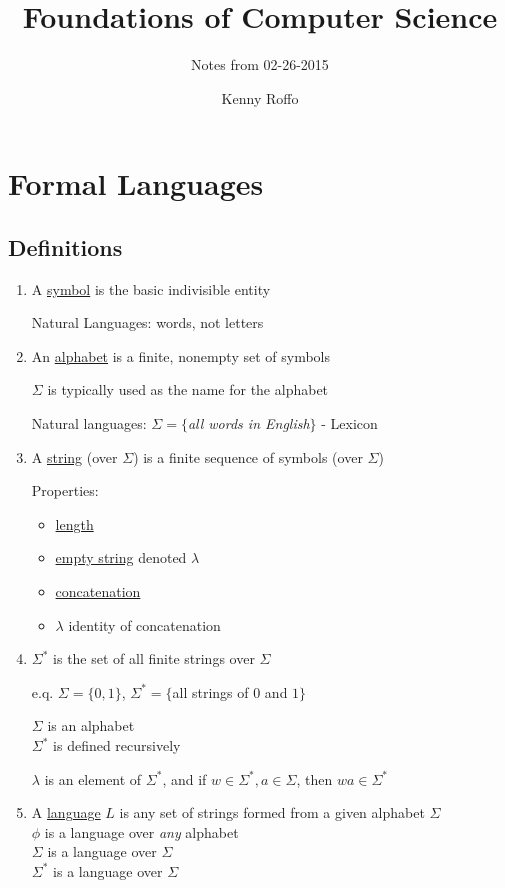 \documentclass{scrartcl}
\title{Foundations of Computer Science}
\subtitle{Notes from 02-26-2015}
\author{Kenny Roffo}
\begin{document}
\maketitle
\tableofcontents\pagebreak

\section{Formal Languages}

\subsection{Definitions}

\begin{enumerate}

\item A \underline{symbol} is the basic indivisible entity

Natural Languages: words, not letters

\item An \underline{alphabet} is a finite, nonempty set of symbols

$\Sigma$ is typically used as the name for the alphabet

Natural languages: $\Sigma=\{$\emph{all words in English}$\}$ - Lexicon 

\item A \underline{string} (over $\Sigma$) is a finite sequence of symbols (over $\Sigma$)

  Properties: \begin{itemize}
  \item \underline{length}
  \item \underline{empty string} denoted $\lambda$
  \item \underline{concatenation}
  \item $\lambda$ identity of concatenation
  \end{itemize} 

\item $\Sigma ^*$ is the set of all finite strings over $\Sigma$

e.q. $\Sigma=\{0,1\}$, $\Sigma ^* = \{$all strings of $0$ and $1\}$

$\Sigma$ is an alphabet\\
$\Sigma ^*$ is defined recursively

$\lambda$ is an element of $\Sigma ^*$, and if $w \in \Sigma ^*, a \in \Sigma$, then $wa \in \Sigma ^*$

\item A \underline{language} $L$ is any set of strings formed from a given alphabet $\Sigma$\\
$\phi$ is a language over \emph{any} alphabet\\
$\Sigma$ is a language over $\Sigma$\\
$\Sigma ^*$ is a language over $\Sigma$
\end{enumerate}
\end{document}

